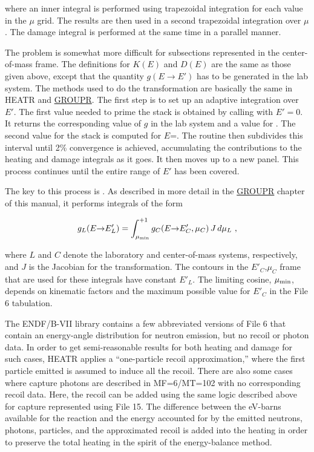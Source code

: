 \noindent
where an inner integral is performed using trapezoidal
integration for each value in the $\mu$ grid.  The results
are then used in a second trapezoidal integration over $\mu$.
The damage integral is performed at the same time in a
parallel manner.

The problem is somewhat more difficult for subsections
represented in the center-of-mass frame.  The definitions
for $K(E)$ and $D(E)$ are the same as those given above,
except that the quantity $g(E{\rightarrow}E')$ has to be
generated in the lab system.  The methods used to do the
transformation are basically the same in HEATR and
\hyperlink{sGROUPRhy}{GROUPR}.  The
first step is to set up an adaptive
integration over $E'$.  The first value needed to prime the
stack is obtained by calling  with $E'{=}0$.  It
returns the corresponding value of $g$ in the lab system and
a value for .  The second value for the stack is
computed for $E$=.  The routine then subdivides
this interval until 2\% convergence is achieved, accumulating
the contributions to the heating and damage integrals as it
goes.  It then moves up to a new panel.  This process
continues until the entire range of $E'$ has been covered.

The key to this process is .
As described in more detail in the
\hyperlink{sGROUPRhy}{GROUPR} chapter
of this manual, it performs integrals of the form

\begin{equation}
   g_L(E{\rightarrow}E'_L)=\int_{\mu_{\rm min}}^{+1}
      g_C(E{\rightarrow}E'_C,\mu_C)\,J\,d\mu_L\,\,,
\label{transCM}
\end{equation}

\noindent
where $L$ and $C$ denote the laboratory and center-of-mass
systems, respectively, and $J$ is the Jacobian for the
transformation.  The contours in the $E'_C$,$\mu_C$ frame that
are used for these integrals have constant $E'_L$.  The
limiting cosine, $\mu_{\rm min}$, depends on kinematic factors
and the maximum possible value for $E'_C$ in the File 6
tabulation.

The ENDF/B-VII library contains a few
abbreviated versions of File 6 that contain an
energy-angle distribution for neutron emission, but no
recoil or photon data.  In order to get semi-reasonable
results for both heating and damage for such cases, HEATR
applies a ``one-particle recoil approximation,''
where the first particle emitted is assumed to induce all
the recoil.  There are also some cases where capture photons
are described in MF=6/MT=102 with no corresponding recoil data.
Here, the recoil can be added using the same logic described
above for capture represented using File 15.  The difference
between the eV-barns available for the reaction and the energy
accounted for by the emitted neutrons, photons, particles, and
the approximated recoil is added into the heating in order to
preserve the total heating in the spirit of the energy-balance
method.


